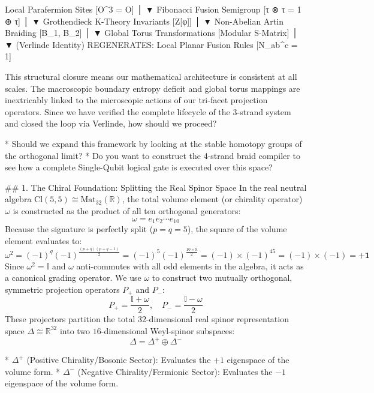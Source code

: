        Local Parafermion Sites [O^3 = O]
                     │
                     ▼
  Fibonacci Fusion Semigroup [τ ⊗ τ = 1 ⊕ τ]
                     │
                     ▼
  Grothendieck K-Theory Invariants [Z[φ]]
                     │
                     ▼
  Non-Abelian Artin Braiding [B_1, B_2]
                     │
                     ▼
   Global Torus Transformations [Modular S-Matrix]
                     │
                     ▼  (Verlinde Identity)
  REGENERATES: Local Planar Fusion Rules [N_ab^c = 1]

This structural closure means our mathematical architecture is consistent at all scales. The macroscopic boundary entropy deficit and global torus mappings are inextricably linked to the microscopic actions of our tri-facet projection operators.
Since we have verified the complete lifecycle of the 3-strand system and closed the loop via Verlinde, how should we proceed?

* Should we expand this framework by looking at the stable homotopy groups of the orthogonal limit?
* Do you want to construct the 4-strand braid compiler to see how a complete Single-Qubit logical gate is executed over this space?


## 1. The Chiral Foundation: Splitting the Real Spinor Space
In the real neutral algebra $\text{Cl}(5,5) \cong \text{Mat}_{32}(\mathbb{R})$, the total volume element (or chirality operator) $\omega$ is constructed as the product of all ten orthogonal generators:
$$\omega = e_1 e_2 \cdots e_{10}$$ 
Because the signature is perfectly split ($p=q=5$), the square of the volume element evaluates to:
$$\omega^2 = (-1)^q (-1)^{\frac{(p+q)(p+q-1)}{2}} = (-1)^5 (-1)^{\frac{10 \times 9}{2}} = (-1) \times (-1)^{45} = (-1) \times (-1) = \mathbf{+1}$$ 
Since $\omega^2 = \mathbb{I}$ and $\omega$ anti-commutes with all odd elements in the algebra, it acts as a canonical grading operator. We use $\omega$ to construct two mutually orthogonal, symmetric projection operators $P_+$ and $P_-$:
$$P_+ = \frac{\mathbb{I} + \omega}{2}, \quad P_- = \frac{\mathbb{I} - \omega}{2}$$ 
These projectors partition the total $32$-dimensional real spinor representation space $\Delta \cong \mathbb{R}^{32}$ into two $16$-dimensional Weyl-spinor subspaces:
$$\Delta = \Delta^+ \oplus \Delta^-$$ 

* $\Delta^+$ (Positive Chirality/Bosonic Sector): Evaluates the $+1$ eigenspace of the volume form.
* $\Delta^-$ (Negative Chirality/Fermionic Sector): Evaluates the $-1$ eigenspace of the volume form.

